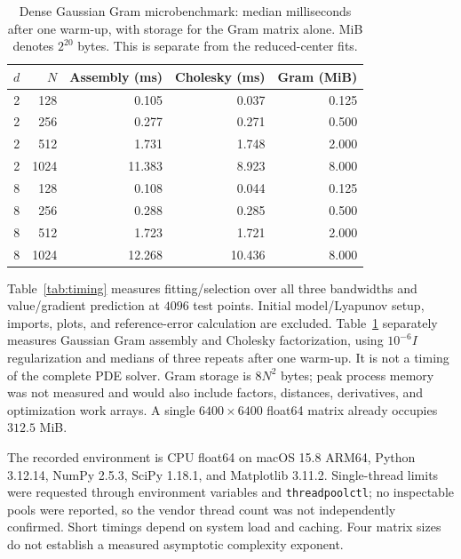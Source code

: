 \documentclass[11pt]{article}
\theoremstyle{plain}      %
\theoremstyle{definition} %
\providecommand{\DIFaddtex}[1]{{\protect\color{blue}#1}} %
\providecommand{\DIFaddFL}[1]{\DIFadd{#1}} %
\providecommand{\DIFadd}[1]{\texorpdfstring{\DIFaddtex{#1}}{#1}} %
\begin{document}
\begin{table}[htbp]
\centering\small
\caption{\DIFaddFL{Dense Gaussian Gram microbenchmark: median milliseconds after one warm-up, with storage for the Gram matrix alone. MiB denotes $2^{20}$ bytes. This is separate from the reduced-center fits.}}\label{tab:dense}
\begin{tabular}{@{}rrrrr@{}}
\toprule
\DIFaddFL{$d$ }& \DIFaddFL{$N$ }& \DIFaddFL{Assembly (ms) }& \DIFaddFL{Cholesky (ms) }& \DIFaddFL{Gram (MiB)}\\
\midrule
\DIFaddFL{2 }& \DIFaddFL{128 }& \DIFaddFL{0.105 }& \DIFaddFL{0.037 }& \DIFaddFL{0.125}\\
\DIFaddFL{2 }& \DIFaddFL{256 }& \DIFaddFL{0.277 }& \DIFaddFL{0.271 }& \DIFaddFL{0.500}\\
\DIFaddFL{2 }& \DIFaddFL{512 }& \DIFaddFL{1.731 }& \DIFaddFL{1.748 }& \DIFaddFL{2.000}\\
\DIFaddFL{2 }& \DIFaddFL{1024 }& \DIFaddFL{11.383 }& \DIFaddFL{8.923 }& \DIFaddFL{8.000}\\
\DIFaddFL{8 }& \DIFaddFL{128 }& \DIFaddFL{0.108 }& \DIFaddFL{0.044 }& \DIFaddFL{0.125}\\
\DIFaddFL{8 }& \DIFaddFL{256 }& \DIFaddFL{0.288 }& \DIFaddFL{0.285 }& \DIFaddFL{0.500}\\
\DIFaddFL{8 }& \DIFaddFL{512 }& \DIFaddFL{1.723 }& \DIFaddFL{1.721 }& \DIFaddFL{2.000}\\
\DIFaddFL{8 }& \DIFaddFL{1024 }& \DIFaddFL{12.268 }& \DIFaddFL{10.436 }& \DIFaddFL{8.000}\\
\bottomrule
\end{tabular}
\end{table}


\DIFadd{Table~\ref{tab:timing} measures fitting/selection over all three bandwidths and value/gradient prediction at $4096$ test points. Initial model/Lyapunov setup, imports, plots, and reference-error calculation are excluded. Table~\ref{tab:dense} separately measures Gaussian Gram assembly and Cholesky factorization, using $10^{-6}I$ regularization and medians of three repeats after one warm-up. It is not a timing of the complete PDE solver. Gram storage is $8N^2$ bytes; peak process memory was not measured and would also include factors, distances, derivatives, and optimization work arrays. A single $6400\times6400$ float64 matrix already occupies $312.5$ MiB.
}

\DIFadd{The recorded environment is CPU float64 on macOS 15.8 ARM64, Python 3.12.14, NumPy 2.5.3, SciPy 1.18.1, and Matplotlib 3.11.2. Single-thread limits were requested through environment variables and \texttt{threadpoolctl}; no inspectable pools were reported, so the vendor thread count was not independently confirmed. Short timings depend on system load and caching. Four matrix sizes do not establish a measured asymptotic complexity exponent.
}
\end{document}
